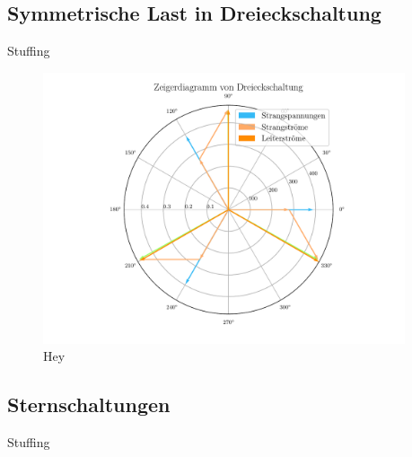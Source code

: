 \documentclass[12pt,english,ngerman]{scrartcl}
\begin{document}
\subsection{Symmetrische Last in Dreieckschaltung}
\begin{table}[H]
	\caption{Stuffing
	}\label{tab:powerDreieck}
	\centering
	
\end{table}

\begin{figure}[H]
	\begin{center}
		\includegraphics[width = 0.95\textwidth]{figures/zeigerDreieck.pdf}
	\end{center}
	\caption[Stromabhängige Leistungskurve einer Glühbirne]{ Hey
	}\label{fig:zeigerDreieck}
\end{figure}

\subsection{Sternschaltungen}

\begin{table}[H]
	\caption{Stuffing
	}\label{tab:powerStern}
	\centering
	
\end{table}
\end{document}
